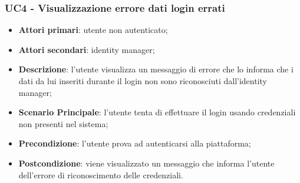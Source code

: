 \subsubsection{UC4 - Visualizzazione errore dati login errati}
\begin{itemize}
\item \textbf{Attori primari}: utente non autenticato;
\item \textbf{Attori secondari}: identity manager;
\item \textbf{Descrizione}: l'utente visualizza un messaggio di errore che lo informa che i dati da lui inseriti durante il login non sono riconosciuti dall'identity manager;
\item \textbf{Scenario Principale}: l'utente tenta di effettuare il login usando credenziali non presenti nel sistema;
\item \textbf{Precondizione}: l'utente prova ad autenticarsi alla piattaforma;
\item \textbf{Postcondizione}: viene visualizzato un messaggio che informa l'utente dell'errore di riconoscimento delle credenziali.
\end{itemize}
